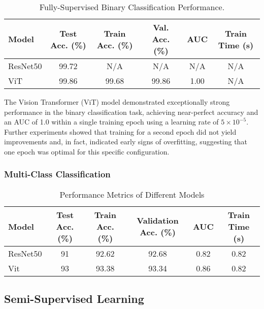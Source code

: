 \documentclass{article}
\begin{document}
\renewcommand{\arraystretch}{1.2} 
\begin{table}[h!] 
    \centering 
    \caption{Fully-Supervised Binary Classification Performance.}
    \label{tab:fully_binary_perf} 
    \begin{tabular}{|l|c|c|c|c|c|}
        \hline
        Model & Test Acc. (\%) & Train Acc. (\%) & Val. Acc. (\%) & AUC & Train Time (s) \\
        \hline
        ResNet50 & 99.72 & N/A & N/A & N/A & N/A \\
        ViT & 99.86 & 99.68 & 99.86 & 1.00 & N/A \\
        \hline
    \end{tabular}
\end{table}

The Vision Transformer (ViT) model demonstrated exceptionally strong performance in the binary classification task, achieving near-perfect accuracy and an AUC of 1.0 within a single training epoch using a learning rate of \(5 \times 10^{-5}\). Further experiments showed that training for a second epoch did not yield improvements and, in fact, indicated early signs of overfitting, suggesting that one epoch was optimal for this specific configuration.

\subsubsection{Multi-Class Classification}

\renewcommand{\arraystretch}{1.2} 
\begin{table}[h!] %
    \centering %
    \caption{Performance Metrics of Different Models} %
    \label{tab:fully_binary_perf} %
    \begin{tabular}{|l|c|c|c|c|c|}
        \hline
        Model & Test Acc. (\%) & Train Acc. (\%) & Validation Acc. (\%) & AUC & Train Time (s) \\
        \hline
        ResNet50 & 91 & 92.62 & 92.68 & 0.82 & 0.82 \\
        Vit & 93 & 93.38 & 93.34 & 0.86 & 0.82 \\
        \hline
    \end{tabular}
\end{table}

\subsection{Semi-Supervised Learning}
\end{document}
